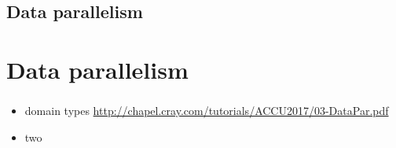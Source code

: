 
\section{Data parallelism}
\chapter{Data parallelism}
\subsection{} %

\begin{frame}{}
  \begin{itemize}\setlength{\itemsep}{3mm}
    \item domain types \url{http://chapel.cray.com/tutorials/ACCU2017/03-DataPar.pdf}
    \item two
  \end{itemize}
\end{frame}

